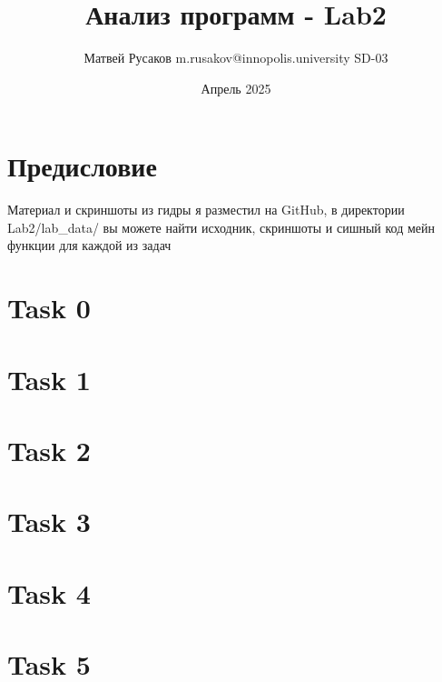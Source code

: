 \usepackage{graphicx}
\usepackage{tabularx}
\usepackage{amsmath}
\usepackage[T2A]{fontenc}
\usepackage[top=5cm,bottom=3cm,right=3cm,left=3cm]{geometry}
\usepackage[utf8]{inputenc}

\title{Анализ программ - Lab2}
\author{Матвей Русаков m.rusakov@innopolis.university SD-03}
\date{Апрель 2025}



    \maketitle


    \section*{Предисловие}

    Материал и скриншоты из гидры я разместил на GitHub, в директории Lab2/lab\_data/ вы можете найти исходник,
    скриншоты и сишный код мейн функции для каждой из задач

    \section*{Task 0}
    

    \section*{Task 1}
    

    \section*{Task 2}
    

    \section*{Task 3}
    

    \section*{Task 4}
    

    \section*{Task 5}
    

